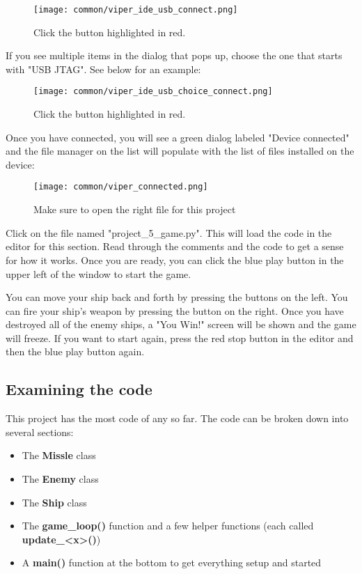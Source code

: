 \begin{figure}[H]
    \centering
    \texttt{[image: common/viper\_ide\_usb\_connect.png]}
    \caption{Click the button highlighted in red.}
\end{figure}

If you see multiple items in the dialog that pops up, choose the one that starts with "USB JTAG". See below for an example:
\begin{figure}[H]
    \centering
    \texttt{[image: common/viper\_ide\_usb\_choice\_connect.png]}
    \caption{Click the button highlighted in red.}
\end{figure}

Once you have connected, you will see a green dialog labeled "Device connected" and the file manager on the list
will populate with the list of files installed on the device:
\begin{figure}[H]
    \centering
    \texttt{[image: common/viper\_connected.png]}
    \caption{Make sure to open the right file for this project}
\end{figure}

Click on the file named "project\_5\_game.py". This will load the code in the editor for this section. Read through the comments
and the code to get a sense for how it works. Once you are ready, you can click the blue play button in the upper left of the window
to start the game.

You can move your ship back and forth by pressing the buttons on the left. You can fire your ship's weapon by pressing the
button on the right. Once you have destroyed all of the enemy ships, a "You Win!" screen will be shown and the game will freeze.
If you want to start again, press the red stop button in the editor and then the blue play button again.

\subsection{Examining the code}

This project has the most code of any so far. The code can be broken down into several sections:
\begin{itemize}
    \item The \textbf{Missle} class
    \item The \textbf{Enemy} class
    \item The \textbf{Ship} class
    \item The \textbf{game\_loop()} function and a few helper functions (each called \textbf{update\_<x>()})
    \item A \textbf{main()} function at the bottom to get everything setup and started
\end{itemize}

